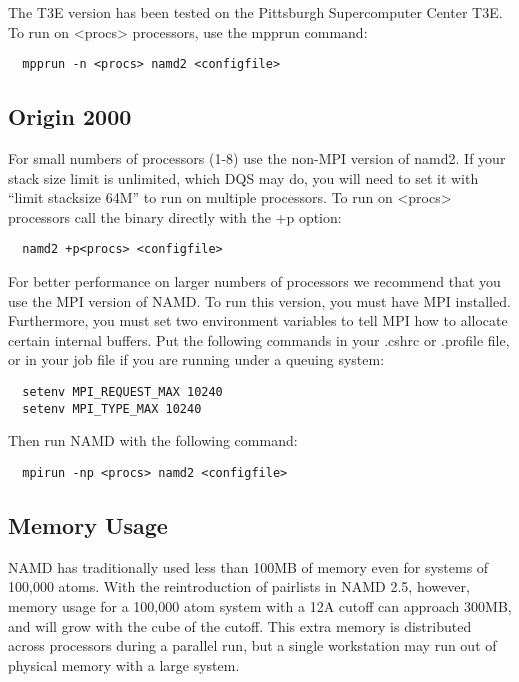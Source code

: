 The T3E version has been tested on the Pittsburgh Supercomputer Center
T3E.  To run on <procs> processors, use the mpprun command:

\begin{verbatim}
  mpprun -n <procs> namd2 <configfile>
\end{verbatim}

\subsection{Origin 2000}

For small numbers of processors (1-8) use the non-MPI version of namd2.
If your stack size limit is unlimited, which DQS may do, you will need
to set it with ``limit stacksize 64M'' to run on multiple processors.
To run on <procs> processors call the binary directly with the +p option:

\begin{verbatim}
  namd2 +p<procs> <configfile>
\end{verbatim}

For better performance on larger numbers of processors we recommend
that you use the MPI version of NAMD.  To run this version, you must
have MPI installed.  Furthermore, you must set two environment
variables to tell MPI how to allocate certain internal buffers.  Put
the following commands in your .cshrc or .profile file, or in your
job file if you are running under a queuing system:

\begin{verbatim}
  setenv MPI_REQUEST_MAX 10240
  setenv MPI_TYPE_MAX 10240
\end{verbatim}

Then run NAMD with the following command:

\begin{verbatim}
  mpirun -np <procs> namd2 <configfile>
\end{verbatim}

\subsection{Memory Usage}

NAMD has traditionally used less than 100MB of memory even for systems
of 100,000 atoms.  With the reintroduction of pairlists in NAMD 2.5,
however, memory usage for a 100,000 atom system with a 12A cutoff can
approach 300MB, and will grow with the cube of the cutoff.  This extra
memory is distributed across processors during a parallel run, but a
single workstation may run out of physical memory with a large system.

